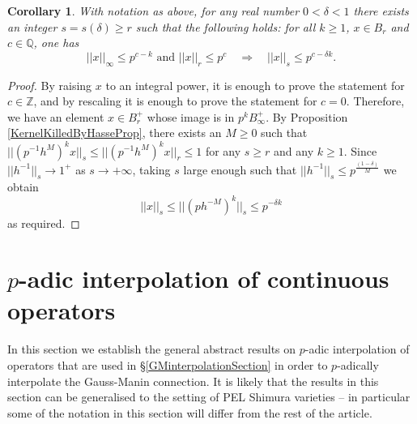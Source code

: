 \documentclass[10pt, oneside]{amsart}
\numberwithin{equation}{subsection}
\newtheorem{corollary}[equation]{Corollary}
\theoremstyle{definition}
\theoremstyle{remark}
\newcommand{\mbb}[1]{\mathbb{#1}}
\begin{document}
\begin{corollary} \label{OCcorollary}
With notation as above, for any real number $0 < \delta < 1$ there exists an integer $s = s(\delta) \geq r$ such that the following holds: for all $k \geq 1$, $x \in B_{r}$ and $c \in \mbb{Q}$, one has
\[
|\!| x |\!|_{\infty} \leq p^{c-k} \text{ and } |\!| x |\!|_{r} \leq p^c \quad \Rightarrow \quad |\!| x |\!|_{s} \leq p^{c-\delta k}  .
\]
\end{corollary}

\begin{proof}
By raising $x$ to an integral power, it is enough to prove the statement for $c \in \mbb{Z}$, and by rescaling it is enough to prove the statement for $c=0$. Therefore, we have an element $x \in B_{r}^+$ whose image is in $p^k B_{\infty}^+$. By Proposition \ref{KernelKilledByHasseProp}, there exists an $M \geq 0$ such that $|\!| (p^{-1} h^M)^k x | \!|_s \leq |\!| (p^{-1} h^M)^k x | \!|_r \leq 1$ for any $s \geq r$ and any $k \geq 1$. Since $|\!|h^{-1}|\!|_s \to 1^+$ as $s \to +\infty$, taking $s$ large enough such that $|\!|h^{-1}|\!|_s  \leq p^{\frac{(1 - \delta)}{M}}$ we obtain
\[
|\!|x|\!|_s \leq |\!| (p h^{-M})^k |\!|_s \leq p^{-\delta k}
\]
as required.
\end{proof}

\section{\texorpdfstring{$p$}{p}-adic interpolation of continuous operators} \label{SectionPADICINTCONT}

In this section we establish the general abstract results on $p$-adic interpolation of operators that are used in \S \ref{GMinterpolationSection} in order to $p$-adically interpolate the Gauss-Manin connection. It is likely that the results in this section can be generalised to the setting of PEL Shimura varieties -- in particular some of the notation in this section will differ from the rest of the article.
\end{document}
